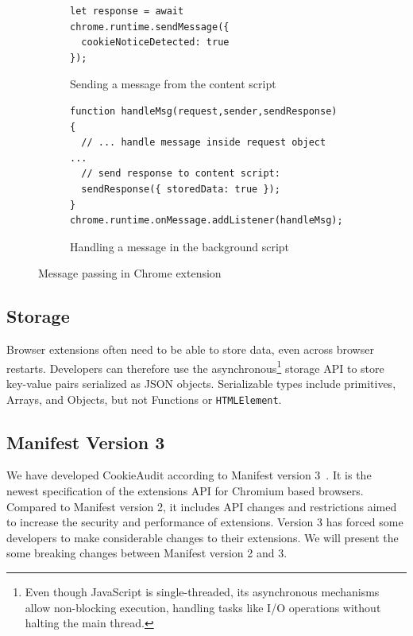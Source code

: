 \begin{figure}
	\centering
	    
	\begin{subfigure}{\textwidth}
		\centering
		\begin{lstlisting}
let response = await chrome.runtime.sendMessage({
  cookieNoticeDetected: true
});
		\end{lstlisting}
		\caption{Sending a message from the content script}
	\end{subfigure}
	    
	\begin{subfigure}{\textwidth}
		\centering
		\begin{lstlisting}
function handleMsg(request,sender,sendResponse) {
  // ... handle message inside request object ...
  // send response to content script:
  sendResponse({ storedData: true });
}
chrome.runtime.onMessage.addListener(handleMsg);
		\end{lstlisting}
		\caption{Handling a message in the background script}
	\end{subfigure}
	    
	\caption{Message passing in Chrome extension}
	\label{fig:message-passing}
\end{figure}

\subsection{Storage} \label{subsec:storage}
Browser extensions often need to be able to store data, even across browser restarts.
Developers can therefore use the asynchronous\footnote{Even though JavaScript is single-threaded, its asynchronous mechanisms allow non-blocking execution, handling tasks like I/O operations without halting the main thread.} storage API to store key-value pairs serialized as JSON objects. Serializable types include primitives, Arrays, and Objects, but not Functions or \verb|HTMLElement|.

\subsection{Manifest Version 3} \label{subsec:manifest-v3}
We have developed CookieAudit according to Manifest version 3~\cite{manifestv3}.
It is the newest specification of the extensions API for Chromium based browsers.
Compared to Manifest version 2, it includes API changes and restrictions aimed to increase the security and performance of extensions.
Version 3 has forced some developers to make considerable changes to their extensions.
We will present the some breaking changes between Manifest version 2 and 3.

